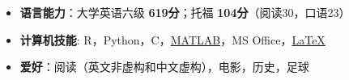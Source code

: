   \begin{itemize}[leftmargin=*]
	\item \textbf{语言能力}：大学英语六级 \textbf{619分}；托福 \textbf{104分}（阅读30，口语23）
    \item \textbf{计算机技能}: R，Python，C，\href{https://www.mathworks.com/}{MATLAB}，MS Office，\href{https://www.latex-project.org/}{\LaTeX}
    \item \textbf{爱好}：阅读（英文非虚构和中文虚构），电影，历史，足球
  \end{itemize}
  